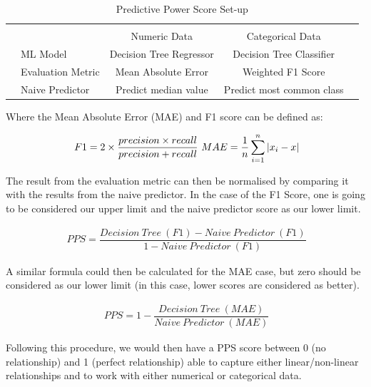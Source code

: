 \begin{appendices}
{
\begin{table}[h!]
\centering
\begin{tabular}{l|l|c|c|c}
\multicolumn{2}{c}{}&\multicolumn{2}{c}{}&\\
\cline{3-4}
\multicolumn{2}{c|}{}&Numeric Data &Categorical Data &\multicolumn{1}{c}{}\\
\cline{2-4}
\multirow{}{}{}& ML Model & Decision Tree Regressor & Decision Tree Classifier & \\
\cline{2-4}
& Evaluation Metric & Mean Absolute Error & Weighted F1 Score & \\
\cline{2-4}
& Naive Predictor & Predict median value & Predict most common class & \\
\cline{2-4}
\end{tabular}
\caption{Predictive Power Score Set-up}
\label{setup}
\end{table}
}

Where the Mean Absolute Error (MAE) and F1 score can be defined as:

\useshortskip
\begin{align}
\ F1 = 2 \times \dfrac{precision \times recall}{precision + recall}
\ MAE = \dfrac{1}{n}\sum_{i=1}^{n}\abs{x_{i} - x}
\end{align}
\useshortskip

The result from the evaluation metric can then be normalised by comparing it with the results from the naive predictor. In the case of the F1 Score, one is going to be considered our upper limit and the naive predictor score as our lower limit.

\useshortskip
\begin{align}
\ PPS = \dfrac{Decision\:Tree\:(F1) - Naive\:Predictor\:(F1)}{1 - Naive\:Predictor\:(F1)}
\end{align}
\useshortskip

A similar formula could then be calculated for the MAE case, but zero should be considered as our lower limit (in this case, lower scores are considered as better).

\useshortskip
\begin{align}
\ PPS = 1 - \dfrac{Decision\:Tree\:(MAE)}{Naive\:Predictor\:(MAE)}
\end{align}
\useshortskip

Following this procedure, we would then have a PPS score between 0 (no relationship) and 1 (perfect relationship) able to capture either linear/non-linear relationships and to work with either numerical or categorical data. 


\end{appendices}
